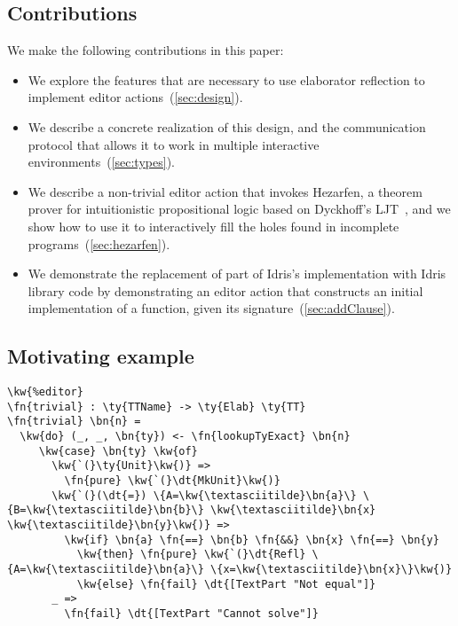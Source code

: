 \subsection*{Contributions}

We make the following contributions in this paper:
\begin{itemize}
\item We explore the features that are necessary to use
  elaborator reflection to implement editor actions~(\autoref{sec:design}).
\item We describe a concrete realization of this design, and the
  communication protocol that allows it to work in multiple
  interactive environments~(\autoref{sec:types}).
\item We describe a non-trivial editor action that invokes Hezarfen, a
  theorem prover for intuitionistic propositional logic based on
  Dyckhoff's LJT~\cite{ljt}, and we show how to use it to
  interactively fill the holes found in incomplete
  programs~(\autoref{sec:hezarfen}).
\item We demonstrate the replacement of part of Idris's implementation
  with Idris library code by demonstrating an editor action that
  constructs an initial implementation of a function, given its
  signature~(\autoref{sec:addClause}).
\end{itemize}


\subsection{Motivating example}


\begin{Verbatim}
\kw{%editor}
\fn{trivial} : \ty{TTName} -> \ty{Elab} \ty{TT}
\fn{trivial} \bn{n} =
  \kw{do} (_, _, \bn{ty}) <- \fn{lookupTyExact} \bn{n}
     \kw{case} \bn{ty} \kw{of}
       \kw{`(}\ty{Unit}\kw{)} =>
         \fn{pure} \kw{`(}\dt{MkUnit}\kw{)}
       \kw{`(}(\dt{=}) \{A=\kw{\textasciitilde}\bn{a}\} \{B=\kw{\textasciitilde}\bn{b}\} \kw{\textasciitilde}\bn{x} \kw{\textasciitilde}\bn{y}\kw{)} =>
         \kw{if} \bn{a} \fn{==} \bn{b} \fn{&&} \bn{x} \fn{==} \bn{y}
           \kw{then} \fn{pure} \kw{`(}\dt{Refl} \{A=\kw{\textasciitilde}\bn{a}\} \{x=\kw{\textasciitilde}\bn{x}\}\kw{)}
           \kw{else} \fn{fail} \dt{[TextPart "Not equal"]}
       _ =>
         \fn{fail} \dt{[TextPart "Cannot solve"]}


\end{Verbatim}

